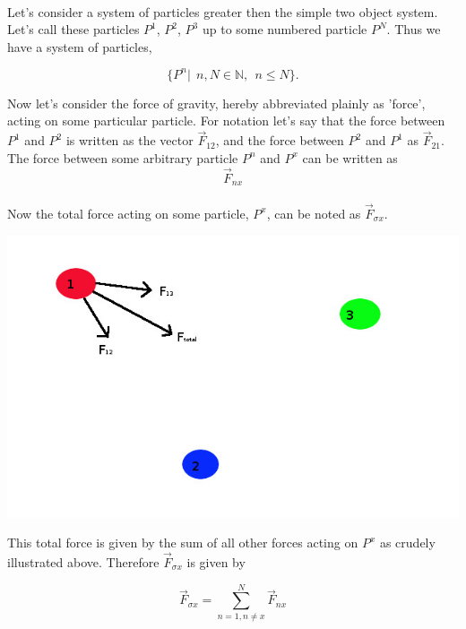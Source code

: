 \documentclass[15pt]{report}
\begin{document}
\paragraph{} Let's consider a system of particles greater then the simple two object system. Let's call these particles $P^1$, $P^2$, $P^3$ up to some numbered particle $P^N$. Thus we have a system of particles, 

\begin{equation}
\{ P^n | \ \ n, N \in \mathbb{N} ,\ \ n \leq N \} .
\end{equation}

Now let's consider the force of gravity, hereby abbreviated plainly as 'force', acting on some particular particle. For notation let's say that the force between $P^1$ and $P^2$ is written as the vector $\vec{F}_{12}$, and the force between $P^2$ and $P^1$ as $\vec{F}_{21}$. The force between some arbitrary particle $P^n$ and $P^x$ can be written as \begin{equation}
\vec{F}_{nx}
\end{equation}
\paragraph{} Now the total force acting on some particle, $P^x$, can be noted as $\vec{F}_{\sigma x}$.

\centerline{\includegraphics[scale=0.5]{vector}}

 This total force is given by the sum of all other forces acting on $P^x$ as crudely illustrated above.
Therefore $\vec{F}_{\sigma x}$ is given by 

\begin{equation}
\vec{F}_{\sigma x} = \sum_{n = 1, n \neq x}^{N} \vec{F}_{nx}
\end{equation}
\end{document}
